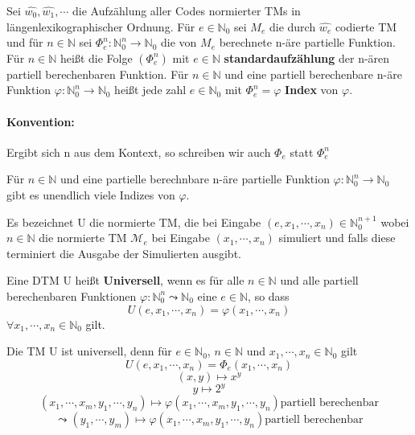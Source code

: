  Sei \(\hat{w_0}, \hat{w_1}, \cdots\) die Aufzählung aller Codes normierter TMs in längenlexikographischer Ordnung. Für \(e \in \mathbb{N}_0\) sei \(M_e\) die durch \(\hat{w_e}\) codierte TM und für \(n \in \mathbb{N}\) sei \(\Phi_e^n : \mathbb{N}_0^n \rightarrow \mathbb{N}_0\) die von \(M_e\) berechnete n-äre partielle Funktion. Für \(n \in \mathbb{N}\) heißt die Folge \((\Phi_e^n)\) mit \(e\in \mathbb{N}\) \textbf{standardaufzählung} der n-ären partiell berechenbaren Funktion. Für \(n \in \mathbb{N} \) und eine partiell berechenbare n-äre Funktion \(\varphi: \mathbb{N}_0^n \rightarrow \mathbb{N}_0\) heißt jede zahl \(e \in \mathbb{N}_0\) mit \(\Phi_e^n = \varphi\) \textbf{Index} von \(\varphi\).

  \paragraph{Konvention: } 
    Ergibt sich n aus dem Kontext, so schreiben wir auch \(\Phi_e\) statt \(\Phi_e^n\)

  Für \(n \in \mathbb{N}\) und eine partielle berechnbare n-äre partielle Funktion \(\varphi : \mathbb{N}_0^n \rightarrow \mathbb{N}_0\) gibt es unendlich viele Indizes von \(\varphi\).

  Es bezeichnet U die normierte TM, die bei Eingabe \((e, x_1, \cdots, x_n) \in \mathbb{N}_0^{n+1}\) wobei \(n \in \mathbb{N}\) die normierte TM \(\mathcal{M}_e\) bei Eingabe \((x_1, \cdots, x_n)\) simuliert und falls diese terminiert die Ausgabe der Simulierten ausgibt.

  Eine DTM U heißt \textbf{Universell}, wenn es für alle \(n \in \mathbb{N}\) und alle partiell berechenbaren Funktionen \(\varphi : \mathbb{N}_0^n \leadsto \mathbb{N}_0\) eine \(e \in \mathbb{N}\), so dass \[U(e, x_1, \cdots, x_n) = \varphi(x_1, \cdots, x_n)\] \(\forall x_1, \cdots, x_n \in \mathbb{N}_0\) gilt.

  Die TM U ist universell, denn für \(e \in \mathbb{N}_0\), \(n \in \mathbb{N}\) und \(x_1, \cdots, x_n \in \mathbb{N}_0\) gilt 
  \[
    U(e,x_1, \cdots, x_n) = \Phi_e(x_1, \cdots, x_n)
  \]
  \[
    (x, y) \mapsto x^y\] \[y \mapsto 2^y
  \] 
  \[
    (x_1, \cdots, x_m, y_1, \cdots, y_n) \mapsto \varphi(x_1, \cdots, x_m, y_1, \cdots, y_n) \text{partiell berechenbar}
  \]
  \[
    \leadsto (y_1,\cdots, y_m) \mapsto \varphi(x_1, \cdots, x_m, y_1, \cdots, y_n) \text{partiell berechenbar}
  \]

